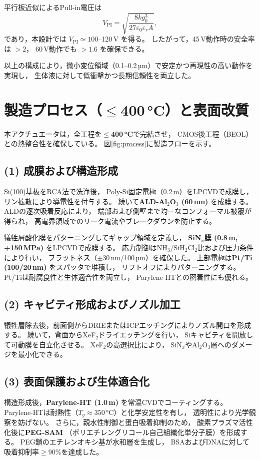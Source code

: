 \documentclass[conference]{IEEEtran}
\begin{document}
平行板近似によるPull-in電圧は
\begin{equation}
  V_{\mathrm{PI}} =
  \sqrt{\frac{8 k g_0^3}{27 \varepsilon_0 \varepsilon_r A}},
  \label{eq:pullin}
\end{equation}
であり，本設計では $V_{\mathrm{PI}} \simeq 100$--120\,V を得る。
したがって，45\,V動作時の安全率は $>2$，
60\,V動作でも $>1.6$ を確保できる。

以上の構成により，微小変位領域（0.1--0.2\,µm）で安定かつ再現性の高い動作を実現し，
生体液に対して低衝撃かつ長期信頼性を両立した。

\section{製造プロセス（\texorpdfstring{$\leq$}{<=}400\,\si{\celsius}）と表面改質}
本アクチュエータは，全工程を\textbf{$\leq$400\,\si{\celsius}}で完結させ，
CMOS後工程（BEOL）との熱整合性を確保している。
図\ref{fig:process}に製造フローを示す。

\subsection*{(1) 成膜および構造形成}
Si(100)基板をRCA法で洗浄後，
Poly-Si固定電極（0.2\,\textmu m）をLPCVDで成膜し，
リン拡散により導電性を付与する。
続いて\textbf{ALD-Al$_2$O$_3$ (60\,nm)} を成膜する。
ALDの逐次吸着反応により，
端部および側壁まで均一なコンフォーマル被覆が得られ，
高電界領域でのリーク電流やブレークダウンを防止する。

犠牲層酸化膜をパターニングしてギャップ領域を定義し，
\textbf{SiN$_x$膜 (0.8\,\textmu m, +150\,MPa)} をLPCVDで成膜する。
応力制御はNH$_3$/SiH$_2$Cl$_2$比および圧力条件により行い，
フラットネス（$\pm$30\,nm/100\,µm）を確保した。
上部電極は\textbf{Pt/Ti (100/20\,nm)} をスパッタで堆積し，
リフトオフによりパターニングする。
Pt/Tiは耐腐食性と生体適合性を両立し，
Parylene-HTとの密着性にも優れる。

\subsection*{(2) キャビティ形成およびノズル加工}
犠牲層除去後，前面側からDRIEまたはICPエッチングによりノズル開口を形成する。
続いて，背面からXeF$_2$ドライエッチングを行い，
Siキャビティを開放して可動膜を自立化させる。
XeF$_2$の高選択比により，
SiN$_x$やAl$_2$O$_3$層へのダメージを最小化できる。

\subsection*{(3) 表面保護および生体適合化}
構造形成後，\textbf{Parylene-HT (1.0\,\textmu m)} を常温CVDでコーティングする。
Parylene-HTは耐熱性（$T_g \approx 350$\,\si{\celsius}）と化学安定性を有し，
透明性により光学観察を妨げない。
さらに，親水性制御と蛋白吸着抑制のため，
酸素プラズマ活性化後に\textbf{PEG-SAM}
（ポリエチレングリコール自己組織化単分子膜）を形成する。
PEG鎖のエチレンオキシ基が水和層を生成し，
BSAおよびDNAに対して吸着抑制率$\geq$90\%を達成した。
\end{document}
